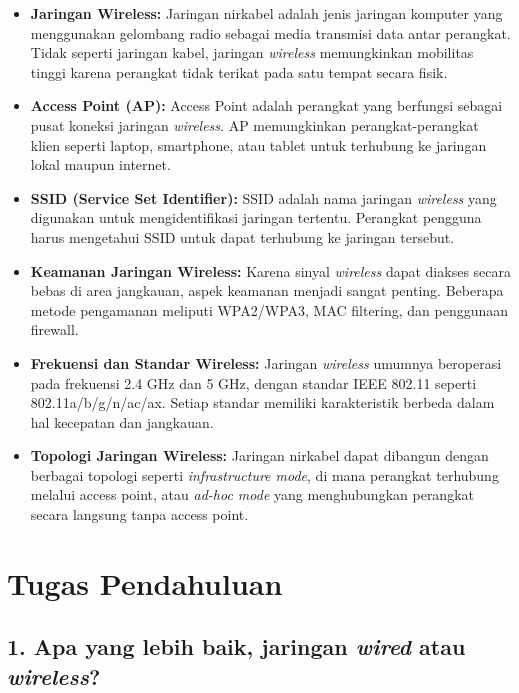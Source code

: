 \begin{itemize}
    \item \textbf{Jaringan Wireless:} Jaringan nirkabel adalah jenis jaringan komputer yang menggunakan gelombang radio sebagai media transmisi data antar perangkat. Tidak seperti jaringan kabel, jaringan \textit{wireless} memungkinkan mobilitas tinggi karena perangkat tidak terikat pada satu tempat secara fisik.

    \item \textbf{Access Point (AP):} Access Point adalah perangkat yang berfungsi sebagai pusat koneksi jaringan \textit{wireless}. AP memungkinkan perangkat-perangkat klien seperti laptop, smartphone, atau tablet untuk terhubung ke jaringan lokal maupun internet.

    \item \textbf{SSID (Service Set Identifier):} SSID adalah nama jaringan \textit{wireless} yang digunakan untuk mengidentifikasi jaringan tertentu. Perangkat pengguna harus mengetahui SSID untuk dapat terhubung ke jaringan tersebut.

    \item \textbf{Keamanan Jaringan Wireless:} Karena sinyal \textit{wireless} dapat diakses secara bebas di area jangkauan, aspek keamanan menjadi sangat penting. Beberapa metode pengamanan meliputi WPA2/WPA3, MAC filtering, dan penggunaan firewall.

    \item \textbf{Frekuensi dan Standar Wireless:} Jaringan \textit{wireless} umumnya beroperasi pada frekuensi 2.4 GHz dan 5 GHz, dengan standar IEEE 802.11 seperti 802.11a/b/g/n/ac/ax. Setiap standar memiliki karakteristik berbeda dalam hal kecepatan dan jangkauan.

    \item \textbf{Topologi Jaringan Wireless:} Jaringan nirkabel dapat dibangun dengan berbagai topologi seperti \textit{infrastructure mode}, di mana perangkat terhubung melalui access point, atau \textit{ad-hoc mode} yang menghubungkan perangkat secara langsung tanpa access point.
\end{itemize}


\section{Tugas Pendahuluan}

\subsection*{1. Apa yang lebih baik, jaringan \textit{wired} atau \textit{wireless}?}

